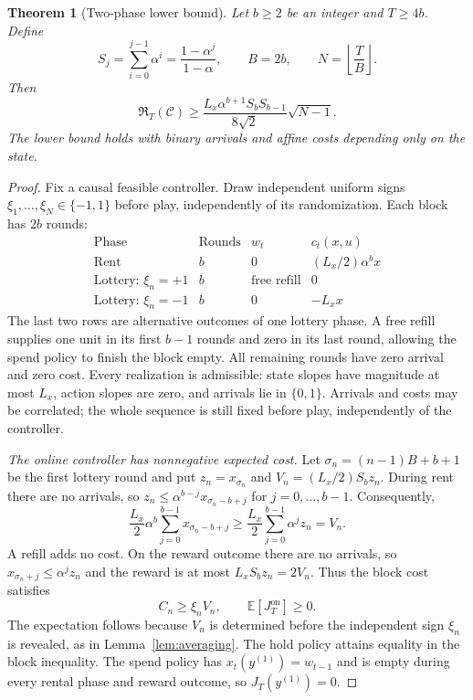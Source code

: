 \documentclass[11pt]{article}
\newtheorem{theorem}{Theorem}[section]
\newcommand{\E}{\mathbb E}
\begin{document}
\begin{theorem}[Two-phase lower bound]
\label{thm:block}
Let $b\ge2$ be an integer and $T\ge4b$. Define
\[
S_j=\sum_{i=0}^{j-1}\alpha^i=\frac{1-\alpha^j}{1-\alpha},
\qquad B=2b,
\qquad N=\left\lfloor\frac TB\right\rfloor.
\]
Then
\begin{equation}
\label{eq:block-bound}
\mathfrak R_T(\mathcal C)
\ge
\frac{L_x\alpha^{b+1}S_bS_{b-1}}{8\sqrt2}\sqrt{N-1}.
\end{equation}
The lower bound holds with binary arrivals and affine costs
depending only on the state.
\end{theorem}

\begin{proof}
Fix a causal feasible controller. Draw independent uniform signs
$\xi_1,\ldots,\xi_N\in\{-1,1\}$ before play, independently of its
randomization. Each block has $2b$ rounds:
\[
\begin{array}{c|c|c|c}
\text{Phase}&\text{Rounds}&w_t&c_t(x,u)\\ \hline
\text{Rent}&b&0&(L_x/2)\alpha^b x\\
\text{Lottery: }\xi_n=+1&b&\text{free refill}&0\\
\text{Lottery: }\xi_n=-1&b&0&-L_xx
\end{array}
\]
The last two rows are alternative outcomes of one lottery phase.
A free refill supplies one unit in its first $b-1$ rounds and zero
in its last round, allowing the spend policy to finish the block
empty. All remaining rounds have zero arrival and zero cost.
Every realization is admissible: state slopes have magnitude at
most $L_x$, action slopes are zero, and arrivals lie in $\{0,1\}$.
Arrivals and costs may be correlated; the whole sequence is still
fixed before play, independently of the controller.

\emph{The online controller has nonnegative expected cost.}
Let $\sigma_n=(n-1)B+b+1$ be the first lottery round and put
$z_n=x_{\sigma_n}$ and $V_n=(L_x/2)S_bz_n$.
During rent there are no arrivals, so
$z_n\le\alpha^{b-j}x_{\sigma_n-b+j}$ for $j=0,\ldots,b-1$.
Consequently,
\[
\frac{L_x}{2}\alpha^b\sum_{j=0}^{b-1}x_{\sigma_n-b+j}
\ge\frac{L_x}{2}\sum_{j=0}^{b-1}\alpha^jz_n=V_n.
\]
A refill adds no cost. On the reward outcome there are no arrivals,
so $x_{\sigma_n+j}\le\alpha^jz_n$ and the reward is at most
$L_xS_bz_n=2V_n$. Thus the block cost satisfies
\[
C_n\ge\xi_nV_n,\qquad \E[J_T^{\mathrm{on}}]\ge0.
\]
The expectation follows because $V_n$ is determined before the
independent sign $\xi_n$ is revealed, as in Lemma~\ref{lem:averaging}.
The hold policy attains equality in the block inequality.
The spend policy has $x_t(y^{(1)})=w_{t-1}$ and is empty during
every rental phase and reward outcome, so $J_T(y^{(1)})=0$.


\end{proof}
\end{document}
